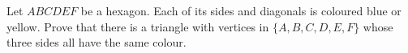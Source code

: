 Let $ABCDEF$ be a hexagon. Each of its sides and diagonals is coloured blue or yellow. Prove that there is a triangle with vertices in $\{A,B,C,D,E,F\}$ whose three sides all have the same colour.
